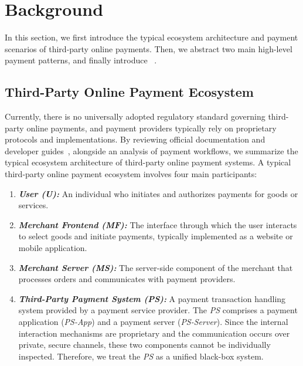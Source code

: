 \section{Background}

In this section, we first introduce the typical ecosystem architecture and payment scenarios of third-party online payments. 
Then, we abstract two main high-level payment patterns, and finally introduce \Tamarin~\cite{Meier2013TAMARINProver}.

\subsection{Third-Party Online Payment Ecosystem} \label{sec:payment-ecosystem}

Currently, there is no universally adopted regulatory standard governing third-party online payments, 
and payment providers typically rely on proprietary protocols and implementations.
By reviewing official documentation and developer guides~\cite{Alipay2025OpenPlatform}, alongside an analysis of payment workflows,
we summarize the typical ecosystem architecture of third-party online payment systems.
A typical third-party online payment ecosystem involves four main participants:

\begin{enumerate}[leftmargin=*]
  \item \textit{\textbf{User (U):}}
    An individual who initiates and authorizes payments for goods or services.
  \item \textit{\textbf{Merchant Frontend (MF):}}
    The interface through which the user interacts to select goods and initiate payments,
    typically implemented as a website or mobile application.
  \item \textit{\textbf{Merchant Server (MS):}}
    The server-side component of the merchant that processes orders and communicates with payment providers.
  \item \textit{\textbf{Third-Party Payment System (PS):}}
    A payment transaction handling system provided by a payment service provider.
    The \emph{PS} comprises a payment application (\emph{PS-App}) and a payment server (\emph{PS-Server}).
    Since the internal interaction mechanisms are proprietary and the communication occurs over private, secure channels, these two components cannot be individually inspected.
    Therefore, we treat the \emph{PS} as a unified black-box system.
\end{enumerate}

